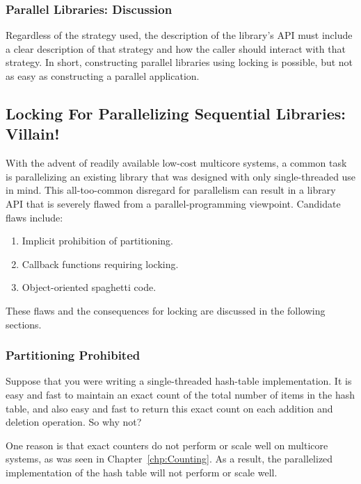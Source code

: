 \subsubsection{Parallel Libraries: Discussion}
\label{sec:locking:Parallel Libraries: Discussion}

Regardless of the strategy used, the description of the library's API
must include a clear description of that strategy and how the caller
should interact with that strategy.
In short, constructing parallel libraries using locking is possible,
but not as easy as constructing a parallel application.

\subsection{Locking For Parallelizing Sequential Libraries: Villain!}
\label{sec:locking:Locking For Parallelizing Sequential Libraries: Villain!}

With the advent of readily available low-cost multicore systems,
a common task is parallelizing an existing library that was designed
with only single-threaded use in mind.
This all-too-common disregard for parallelism can result in a library
API that is severely flawed from a parallel-programming viewpoint.
Candidate flaws include:

\begin{enumerate}
\item	Implicit prohibition of partitioning.
\item	Callback functions requiring locking.
\item	Object-oriented spaghetti code.
\end{enumerate}

These flaws and the consequences for locking are discussed in the following
sections.

\subsubsection{Partitioning Prohibited}
\label{sec:locking:Partitioning Prohibited}

Suppose that you were writing a single-threaded hash-table implementation.
It is easy and fast to maintain an exact count of the total number of items
in the hash table, and also easy and fast to return this exact count on each
addition and deletion operation.
So why not?

One reason is that exact counters do not perform or scale well on
multicore systems, as was
seen in Chapter~\ref{chp:Counting}.
As a result, the parallelized implementation of the hash table will not
perform or scale well.

